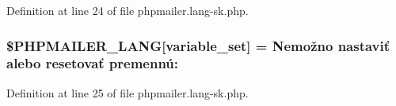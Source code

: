 Definition at line 24 of file phpmailer.\+lang-\/sk.\+php.

\subsubsection[{\texorpdfstring{\$\+P\+H\+P\+M\+A\+I\+L\+E\+R\+\_\+\+L\+A\+NG}{$PHPMAILER_LANG}}]{\setlength{\rightskip}{0pt plus 5cm}\$P\+H\+P\+M\+A\+I\+L\+E\+R\+\_\+\+L\+A\+NG\mbox{[}\textquotesingle{}variable\+\_\+set\textquotesingle{}\mbox{]} = \textquotesingle{}Nemožno nastaviť alebo resetovať premennú\+: \textquotesingle{}}\hypertarget{phpmailer_8lang-sk_8php_af795debc7a739d038742691c358d9032}{}\label{phpmailer_8lang-sk_8php_af795debc7a739d038742691c358d9032}


Definition at line 25 of file phpmailer.\+lang-\/sk.\+php.

